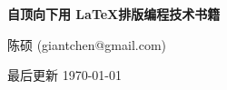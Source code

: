 \thispagestyle{plain}
\begin{center}
  {\LARGE\textbf{自顶向下用 \LaTeX 排版编程技术书籍}}

  \vspace{1em}
  {\large 陈硕 (giantchen@gmail.com)}

  \vspace{1ex}
  最后更新 \today
\end{center}



